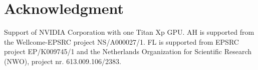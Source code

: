 \documentclass[runningheads]{llncs}
\newcommand{\dontshow}[1]{}
\begin{document}
\section*{Acknowledgment}
Support of NVIDIA Corporation with one Titan Xp GPU.
AH is supported from the Wellcome-EPSRC project NS/A000027/1. FL is supported from EPSRC project EP/K009745/1 and the Netherlands Organization for Scientific Research (NWO), project nr. 613.009.106/2383.

\vspace{-0.5em}


%


\end{document}
